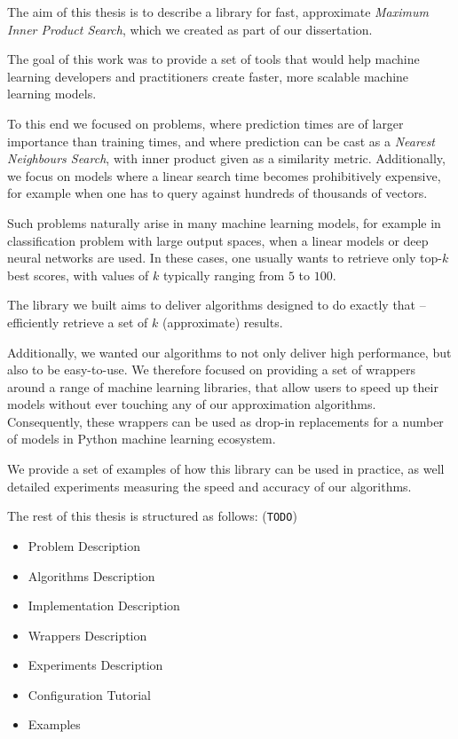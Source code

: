 The aim of this thesis is to describe a library for fast, approximate \textit{Maximum Inner Product Search},
which we created as part of our dissertation. 

The goal of this work was to provide a set of tools that would help machine learning developers and practitioners create faster, 
more scalable machine learning models.

To this end we focused on problems, where prediction times are of larger importance than training times, and where prediction can be 
cast as a \textit{Nearest Neighbours Search}, with inner product given as a similarity metric. Additionally, we focus
on models where a linear search time becomes prohibitively expensive, for example when one has to query against hundreds of thousands of vectors.

Such problems naturally arise in many machine learning models, for example in classification problem with large output spaces, 
when a linear models or deep neural networks are used. In these cases, one usually wants to retrieve only top-$k$ best scores, with values
of $k$ typically ranging from $5$ to $100$.

The library we built aims to deliver algorithms designed to do exactly that -- efficiently retrieve a set of $k$ (approximate) results.

Additionally, we wanted our algorithms to not only deliver high performance, but also to be easy-to-use. We therefore 
focused on providing a set of wrappers around a range of machine learning libraries, that allow users to 
speed up their models without ever touching any of our approximation algorithms. Consequently, these wrappers can be used as drop-in replacements for a number of models in Python machine learning ecosystem.

We provide a set of examples of how this library can be used in practice, as well detailed experiments measuring the speed and 
accuracy of our algorithms.

The rest of this thesis is structured as follows: (\texttt{TODO})
\begin{itemize}
    \setlength\itemsep{1pt}
    \item Problem Description
    \item Algorithms Description
    \item Implementation Description
    \item Wrappers Description
    \item Experiments Description
    \item Configuration Tutorial
    \item Examples
\end{itemize}
